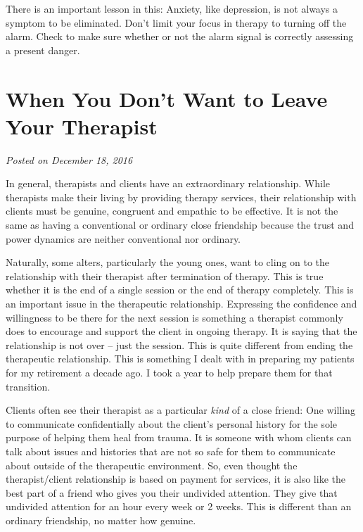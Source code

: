 \documentclass[]{book}
\begin{document}
There is an important lesson in this: Anxiety, like depression, is not always a symptom to be eliminated. Don't limit your focus in therapy to turning off the alarm. Check to make sure whether or not the alarm signal is correctly assessing a present danger.

\hypertarget{when-you-dont-want-to-leave-your-therapist}{%
\section{When You Don't Want to Leave Your Therapist}\label{when-you-dont-want-to-leave-your-therapist}}

\emph{Posted on December 18, 2016}

In general, therapists and clients have an extraordinary relationship. While therapists make their living by providing therapy services, their relationship with clients must be genuine, congruent and empathic to be effective. It is not the same as having a conventional or ordinary close friendship because the trust and power dynamics are neither conventional nor ordinary.

Naturally, some alters, particularly the young ones, want to cling on to the relationship with their therapist after termination of therapy. This is true whether it is the end of a single session or the end of therapy completely. This is an important issue in the therapeutic relationship. Expressing the confidence and willingness to be there for the next session is something a therapist commonly does to encourage and support the client in ongoing therapy. It is saying that the relationship is not over -- just the session. This is quite different from ending the therapeutic relationship. This is something I dealt with in preparing my patients for my retirement a decade ago. I took a year to help prepare them for that transition.

Clients often see their therapist as a particular \emph{kind} of a close friend: One willing to communicate confidentially about the client's personal history for the sole purpose of helping them heal from trauma. It is someone with whom clients can talk about issues and histories that are not so safe for them to communicate about outside of the therapeutic environment. So, even thought the therapist/client relationship is based on payment for services, it is also like the best part of a friend who gives you their undivided attention. They give that undivided attention for an hour every week or 2 weeks. This is different than an ordinary friendship, no matter how genuine.
\end{document}
